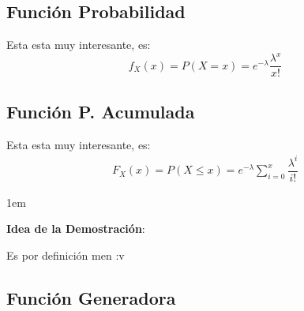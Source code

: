 \documentclass[12pt, fleqn]{report}                             %
\newenvironment{SmallIndentation}[1][0.75em]                    %
        {\begin{adjustwidth}{#1}{}\begin{footnotesize}}             %
        {\end{footnotesize}\end{adjustwidth}}                       %
\theoremstyle{break}                                            %
\begin{document}
            \clearpage
            \subsection{Función Probabilidad}

                Esta esta muy interesante, es:
                \begin{equation*}
                    f_X(x) = P(X = x) = e^{- \lambda} \dfrac{\lambda^x}{x!}
                \end{equation*}


            \vspace{1em}
            \subsection{Función P. Acumulada}

                Esta esta muy interesante, es:
                \begin{align*}
                    F_X(x) 
                        = P(X \leq x)              
                        = e^{-\lambda}\sum_{i = 0}^x \dfrac{\lambda^i}{i!}
                \end{align*}

                \begin{SmallIndentation}[1em]
                    \textbf{Idea de la Demostración}:
                    
                    Es por definición men :v
                
                \end{SmallIndentation}
                    

            \clearpage
            \subsection{Función Generadora}
\end{document}
